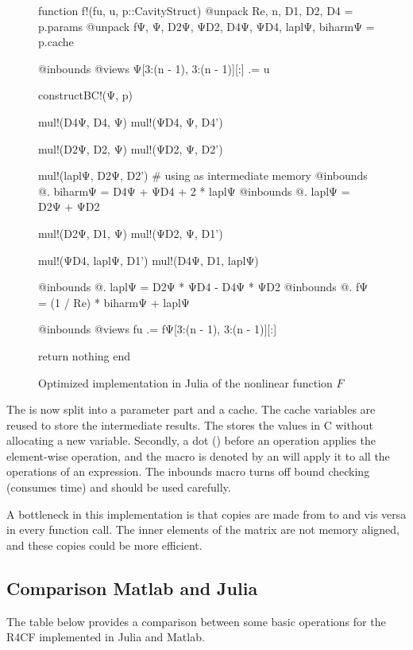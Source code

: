 \begin{figure}[ht]
\begin{jllisting}
function f!(fu, u, p::CavityStruct)
    @unpack Re, n, D1, D2, D4 = p.params
    @unpack fΨ, Ψ, D2Ψ, ΨD2, D4Ψ, ΨD4, laplΨ, biharmΨ = p.cache

    @inbounds @views Ψ[3:(n - 1), 3:(n - 1)][:] .= u

    constructBC!(Ψ, p)

    mul!(D4Ψ, D4, Ψ)
    mul!(ΨD4, Ψ, D4')

    mul!(D2Ψ, D2, Ψ)
    mul!(ΨD2, Ψ, D2')

    mul!(laplΨ, D2Ψ, D2') # using as intermediate memory
    @inbounds @. biharmΨ = D4Ψ + ΨD4 + 2 * laplΨ
    @inbounds @. laplΨ = D2Ψ + ΨD2

    mul!(D2Ψ, D1, Ψ)
    mul!(ΨD2, Ψ, D1')

    mul!(ΨD4, laplΨ, D1')
    mul!(D4Ψ, D1, laplΨ)

    @inbounds @. laplΨ = D2Ψ * ΨD4 - D4Ψ * ΨD2
    @inbounds @. fΨ = (1 / Re) * biharmΨ + laplΨ

    @inbounds @views fu .= fΨ[3:(n - 1), 3:(n - 1)][:]

    return nothing
end
\end{jllisting}
\caption{Optimized implementation in Julia of the nonlinear function $F$}
\end{figure}

The  is now split into a parameter part and a cache.
The cache variables are reused to store the intermediate results. The
 stores the values in C without allocating a new variable.
Secondly, a dot () before an operation applies the element-wise
operation, and the macro is denoted by an  will apply it to all the
operations of an expression. The  inbounds macro turns off bound
checking (consumes time) and should be used carefully.

A bottleneck in this implementation is that copies are made from  to
 and vis versa in every function call. The inner elements of the
matrix  are not memory aligned, and these copies could be more
efficient.

\subsection{Comparison Matlab and Julia}

The table below provides a comparison between some basic operations for the
R4CF implemented in Julia and Matlab. 

